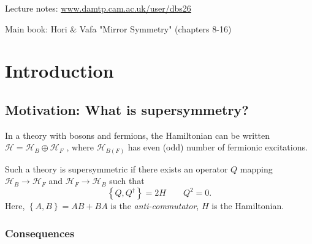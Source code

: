 
Lecture notes: \href{www.damtp.cam.ac.uk/user/dbs26}{www.damtp.cam.ac.uk/user/dbs26}

Main book: Hori \& Vafa "Mirror Symmetry" (chapters 8-16)

\chapter{Introduction}%
\label{cha:introduction}

\section{Motivation: What is supersymmetry?}%
\label{sec:motivation}

In a theory with bosons and fermions, the Hamiltonian can be written $\mathcal{H} = \mathcal{H}_B \oplus \mathcal{H}_F$ , where $\mathcal{H}_{B(F)}$  has even (odd) number of fermionic excitations.

Such a theory is supersymmetric if there exists an operator $Q$ mapping $\mathcal{H}_B \to \mathcal{H}_F$  and $\mathcal{H}_F \to \mathcal{H}_B$  such that
\begin{equation}
  \left\{ Q, Q^{\dagger} \right\} = 2 H \qquad Q^2 = 0.
\end{equation}
Here, $\left\{ A, B \right\} = AB + BA$  is the \emph{anti-commutator},  $H$  is the Hamiltonian.

\subsection*{Consequences}%

